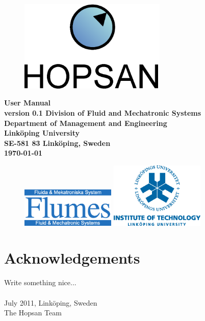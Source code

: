 

\pagestyle{empty}
\sffamily
\begin{figure}[H]
	\centering
   \includegraphics[width=70mm]{media/hopsan_logotype.eps}
	\label{fig:hopsan_logotype}
\end{figure}
\vfill
\begin{center}
\Huge\bfseries User Manual\\
\vfill
\Large version 0.1
\vfill\vfill\vfill
\Large\bfseries\rmfamily
Division of Fluid and Mechatronic Systems\\
Department of Management and Engineering \\
Link\"{o}ping University\\
SE-581 83 Link\"{o}ping, Sweden\\
\vfill
\today

\end{center}
\vfill
\begin{figure}[H]
  \centering
  \includegraphics[width=45mm]{media/flumes_logotype.eps}%
  \hspace{1.3in}%
  \includegraphics[width=45mm]{media/lith_logotype.eps}
\end{figure}
\vfill
\clearpage

\section*{Acknowledgements}
Write something nice...\\ \\
\noindent
July 2011, Link\"{o}ping, Sweden\\
The Hopsan Team

